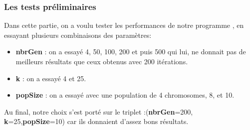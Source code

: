 \documentclass{article}
\begin{document}
\subsubsection{Les tests préliminaires}
Dans cette partie, on a voulu tester les performances de notre programme , en essayant plusieurs combinaisons des paramètres:
\begin{itemize}
	\item \textbf{nbrGen} : on a essayé 4, 50, 100, 200 et puis 500 qui lui,  ne donnait pas de meilleurs résultats que ceux obtenus avec 200 itérations.
	\item\textbf{ k} : on a essayé 4 et 25.
	\item \textbf{popSize} : on a essayé avec une population de 4 chromosomes, 8, et 10.
\end{itemize}
Au final, notre choix s’est porté sur le triplet :(\textbf{nbrGen}=200,\textbf{ k}=25,\textbf{popSize}=10) car ils donnaient d’assez bons résultats.
\end{document}
